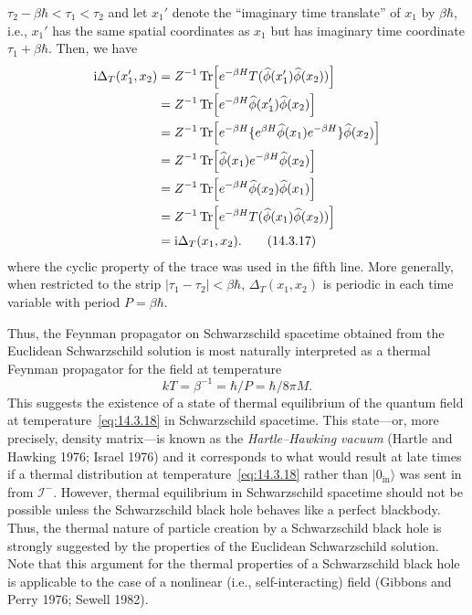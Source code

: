 \(\tau_2-\beta\hbar<\tau_1<\tau_2\) and let \(x_1'\) denote the ``imaginary time
translate'' of \(x_1\) by \(\beta\hbar\), i.e., \(x_1'\) has the same spatial
coordinates as \(x_1\) but has imaginary time coordinate
\(\tau_1+\beta\hbar\). Then, we have
\begin{align}
  \mathrm{i}\Delta_T(x_1',x_2)
  &=Z^{-1}\operatorname{Tr}\!\left[e^{-\beta H}
      T(\widehat\phi(x_1')\widehat\phi(x_2))\right]\notag\\
  &=Z^{-1}\operatorname{Tr}\!\left[e^{-\beta H}
      \widehat\phi(x_1')\widehat\phi(x_2)\right]\notag\\
  &=Z^{-1}\operatorname{Tr}\!\left[e^{-\beta H}
      \{e^{\beta H}\widehat\phi(x_1)e^{-\beta H}\}
      \widehat\phi(x_2)\right]\notag\\
  &=Z^{-1}\operatorname{Tr}\!\left[\widehat\phi(x_1)e^{-\beta H}
      \widehat\phi(x_2)\right]\notag\\
  &=Z^{-1}\operatorname{Tr}\!\left[e^{-\beta H}\widehat\phi(x_2)
      \widehat\phi(x_1)\right]\notag\\
  &=Z^{-1}\operatorname{Tr}\!\left[e^{-\beta H}
      T(\widehat\phi(x_1)\widehat\phi(x_2))\right]\notag\\
  &=\mathrm{i}\Delta_T(x_1,x_2).
  \tag{14.3.17}\label{eq:14.3.17}
\end{align}
where the cyclic property of the trace was used in the fifth line. More generally,
when restricted to the strip \(|\tau_1-\tau_2|<\beta\hbar\),
\(\Delta_T(x_1,x_2)\) is periodic in each time variable with period
\(P=\beta\hbar\).

Thus, the Feynman propagator on Schwarzschild spacetime obtained from the
Euclidean Schwarzschild solution is most naturally interpreted as a thermal Feynman
propagator for the field at temperature
\begin{equation}
  kT=\beta^{-1}=\hbar/P=\hbar/8\pi M.
  \tag{14.3.18}\label{eq:14.3.18}
\end{equation}
This suggests the existence of a state of thermal equilibrium of the quantum field at
temperature~\eqref{eq:14.3.18} in Schwarzschild spacetime. This state---or, more
precisely, density matrix---is known as the \emph{Hartle--Hawking vacuum} (Hartle
and Hawking 1976; Israel 1976) and it corresponds to what would result at late times
if a thermal distribution at temperature~\eqref{eq:14.3.18} rather than
\(\lvert0_{\mathrm{in}}\rangle\) was sent in from \(\mathcal I^-\). However,
thermal equilibrium in Schwarzschild spacetime should not be possible unless the
Schwarzschild black hole behaves like a perfect blackbody. Thus, the thermal nature
of particle creation by a Schwarzschild black hole is strongly suggested by the
properties of the Euclidean Schwarzschild solution. Note that this argument for the
thermal properties of a Schwarzschild black hole is applicable to the case of a
nonlinear (i.e., self-interacting) field (Gibbons and Perry 1976; Sewell 1982).

